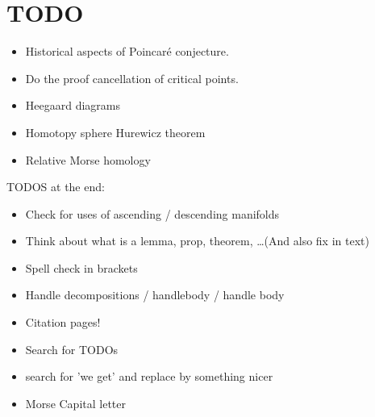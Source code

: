 \chapter*{TODO}
\begin{itemize}
    \item Historical aspects of Poincaré conjecture.
    \item Do the proof cancellation of critical points.
    \item Heegaard diagrams
    \item Homotopy sphere Hurewicz theorem
    \item Relative Morse homology
\end{itemize}


TODOS at the end:
\begin{itemize}
    \item Check for uses of ascending / descending manifolds
    \item Think about what is a lemma, prop, theorem, \ldots (And also fix in text)
    \item Spell check in brackets
    \item Handle decompositions / handlebody / handle body
    \item Citation pages!
    \item Search for TODOs
    \item search for 'we get' and replace by something nicer
    \item Morse Capital letter
\end{itemize}
